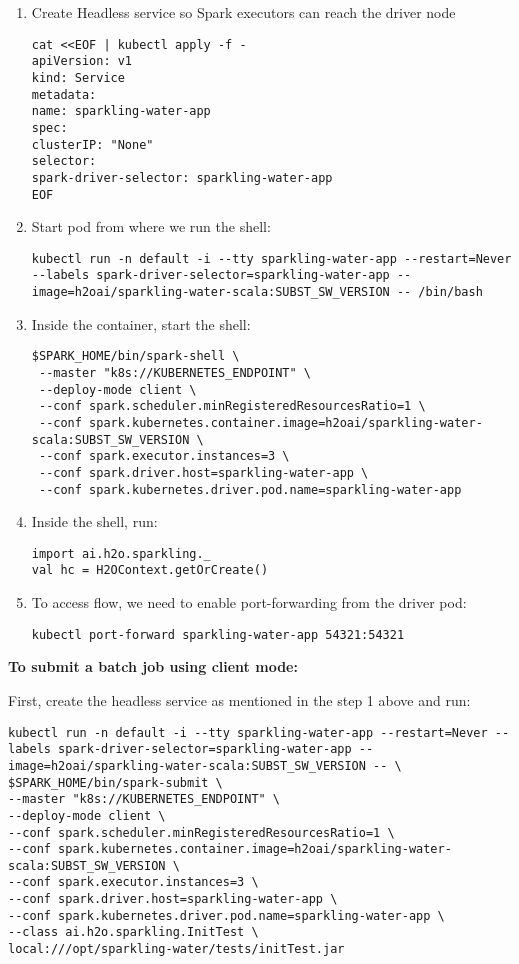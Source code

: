 \begin{enumerate}
    \item Create Headless service so Spark executors can reach the driver node
    \begin{lstlisting}[style=Bash]
cat <<EOF | kubectl apply -f -
apiVersion: v1
kind: Service
metadata:
name: sparkling-water-app
spec:
clusterIP: "None"
selector:
spark-driver-selector: sparkling-water-app
EOF
    \end{lstlisting}
    \item Start pod from where we run the shell:
    \begin{lstlisting}[style=Bash]
kubectl run -n default -i --tty sparkling-water-app --restart=Never --labels spark-driver-selector=sparkling-water-app --image=h2oai/sparkling-water-scala:SUBST_SW_VERSION -- /bin/bash
    \end{lstlisting}
    \item Inside the container, start the shell:
    \begin{lstlisting}[style=Bash]
$SPARK_HOME/bin/spark-shell \
 --master "k8s://KUBERNETES_ENDPOINT" \
 --deploy-mode client \
 --conf spark.scheduler.minRegisteredResourcesRatio=1 \
 --conf spark.kubernetes.container.image=h2oai/sparkling-water-scala:SUBST_SW_VERSION \
 --conf spark.executor.instances=3 \
 --conf spark.driver.host=sparkling-water-app \
 --conf spark.kubernetes.driver.pod.name=sparkling-water-app
    \end{lstlisting}
    \item Inside the shell, run:
    \begin{lstlisting}[style=Scala]
import ai.h2o.sparkling._
val hc = H2OContext.getOrCreate()
    \end{lstlisting}
    \item To access flow, we need to enable port-forwarding from the driver pod:
    \begin{lstlisting}[style=Bash]
kubectl port-forward sparkling-water-app 54321:54321
    \end{lstlisting}
\end{enumerate}


\textbf{To submit a batch job using client mode:}

First, create the headless service as mentioned in the step 1 above and run:

\begin{lstlisting}[style=Bash]
kubectl run -n default -i --tty sparkling-water-app --restart=Never --labels spark-driver-selector=sparkling-water-app --image=h2oai/sparkling-water-scala:SUBST_SW_VERSION -- \
$SPARK_HOME/bin/spark-submit \
--master "k8s://KUBERNETES_ENDPOINT" \
--deploy-mode client \
--conf spark.scheduler.minRegisteredResourcesRatio=1 \
--conf spark.kubernetes.container.image=h2oai/sparkling-water-scala:SUBST_SW_VERSION \
--conf spark.executor.instances=3 \
--conf spark.driver.host=sparkling-water-app \
--conf spark.kubernetes.driver.pod.name=sparkling-water-app \
--class ai.h2o.sparkling.InitTest \
local:///opt/sparkling-water/tests/initTest.jar
\end{lstlisting}

